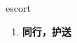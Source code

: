 
\begin{frame}
{\huge escort}
\begin{center}
\begin{enumerate}\Large
  \item \textbf{同行，护送}
\end{enumerate}
\end{center}
\end{frame}
